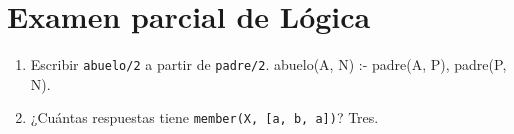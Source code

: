 \section*{Examen parcial de Lógica}
\begin{enumerate}
\item Escribir \texttt{abuelo/2} a partir de \texttt{padre/2}.
\solstart
abuelo(A, N) :- padre(A, P), padre(P, N).
\item ¿Cuántas respuestas tiene \texttt{member(X, [a, b, a])}?
\solstart
Tres.
\solend
\end{enumerate}
